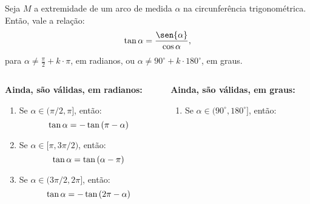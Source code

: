 \begin{frame}
  \begin{theorem}
    Seja $M$ a extremidade de um arco de medida $\alpha$ na circunferência trigonométrica. Então, vale a relação:
    \begin{equation*}
      \tan{\alpha} = \frac{\sen{\alpha}}{\cos{\alpha}},
    \end{equation*}
    para $\alpha\not=\frac{\pi}{2}+k\cdot\pi$, em radianos, ou $\alpha\not=90^{\circ}+k\cdot 180^{\circ}$, em graus.
  \end{theorem}
  \begin{columns}[onlytextwidth]
    \begin{column}{0.49\textwidth}
      \begin{highlight}
        \textbf{Ainda, são válidas, em radianos:}
        \begin{enumerate}
          \item Se $\alpha\in(\pi/2,\pi]$, então:\vspace*{-0.2cm}
          \begin{equation*}
            \tan{\alpha}=-\tan{(\pi-\alpha)}\vspace*{-0.2cm}
          \end{equation*}
          \item Se $\alpha\in[\pi,3\pi/2)$, então:\vspace*{-0.2cm}
          \begin{equation*}
            \tan{\alpha}=\tan{(\alpha-\pi)}\vspace*{-0.2cm}
          \end{equation*}
          \item Se $\alpha\in(3\pi/2,2\pi]$, então:\vspace*{-0.2cm}
          \begin{equation*}
            \tan{\alpha}=-\tan{(2\pi-\alpha)}\vspace*{-0.2cm}
          \end{equation*}
        \end{enumerate}
      \end{highlight}
    \end{column}
    \begin{column}{0.49\textwidth}
      \begin{highlight}
        \textbf{Ainda, são válidas, em graus:}
        \begin{enumerate}
          \item Se $\alpha\in(90^{\circ},180^{\circ}]$, então:\vspace*{-0.2cm}

\end{enumerate}
\end{highlight}
\end{column}
\end{columns}
\end{frame}

